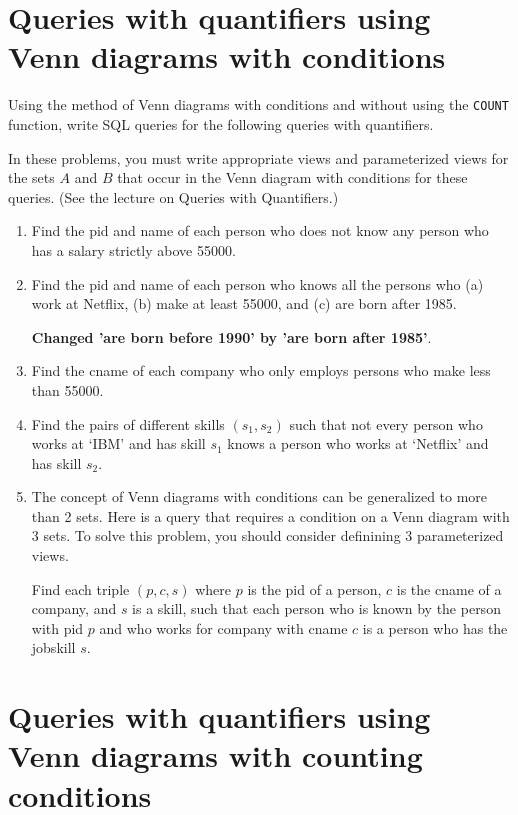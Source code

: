 \documentclass{article}
\begin{document}
\section{Queries with quantifiers using Venn diagrams with conditions}

Using the method of Venn diagrams with conditions and without using the {\tt COUNT} function,
write SQL queries for the following queries with quantifiers.

In these problems, you must write appropriate views and parameterized views for the sets $A$ and $B$
that occur in the Venn diagram with conditions for these queries.  (See the lecture on Queries with Quantifiers.)

\begin{enumerate}[resume]
\item Find the pid and name of each person who does not know any person who has a salary strictly above 55000.
\item Find the pid and name of each person who knows all the persons who (a) work  at Netflix, (b) make at least 55000, and
(c) are born after 1985.

\noindent
{\bf Changed 'are born before 1990' by 'are born after 1985'}.

\item Find the cname of each company who only employs persons who make less than 55000.
\item Find the pairs of different skills $(s_1,s_2)$ such that not every person who works at `IBM' and has skill $s_1$  
knows a person who works at `Netflix' and has skill $s_2$.
\item The concept of Venn diagrams with conditions can be generalized to more than 2 sets.   Here is a query that requires
a condition on a Venn diagram with 3 sets.   To solve this problem, you should consider definining 3 parameterized views.

Find each triple $(p, c, s)$ where $p$ is the pid of a person, $c$ is the cname of a company, and $s$ is a skill, such that
each person who is known by the person with pid $p$ and who works for company with cname $c$ is a person who has the jobskill $s$.


\end{enumerate}

\newpage
\section{Queries with quantifiers using Venn diagrams with counting conditions}
\end{document}
